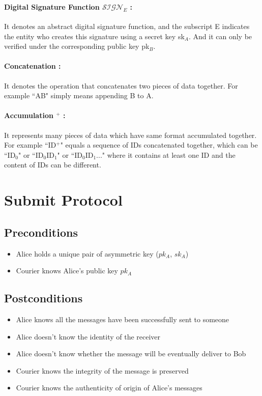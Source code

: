 \paragraph{Digital Signature Function $\mathcal{SIGN}_E$ :}
It denotes an abstract digital signature function, and the subscript E indicates the entity who creates this signature using a secret key sk$_A$. And it can only be verified under the corresponding public key pk$_B$.
\paragraph{Concatenation \textbar\textbar :}
It denotes the operation that concatenates two pieces of data together. For example ``A\textbar\textbar B" simply means appending B to A.
\paragraph{Accumulation $^+$ :}
It represents many pieces of data which have same format accumulated together. For example ``ID$^+$" equals a sequence of IDs concatenated together, which can be ``ID$_0$" or ``ID$_0$\textbar\textbar ID$_1$" or ``ID$_0$\textbar\textbar ID$_1$\textbar\textbar  ..." where it contains at least one ID and the content of IDs can be different.
\section{Submit Protocol}
\subsection{Preconditions}
\begin{itemize}
\item Alice holds a unique pair of asymmetric key ($pk_A$, $sk_A$)
\item Courier knows Alice's public key $pk_A$
\end{itemize}
\subsection{Postconditions}
\begin{itemize}
\item Alice knows all the messages have been successfully sent to someone
\item Alice doesn't know the identity of the receiver
\item Alice doesn't know whether the message will be eventually deliver to Bob
\item Courier knows the integrity of the message is preserved
\item Courier knows the authenticity of origin of Alice's messages
\end{itemize}

